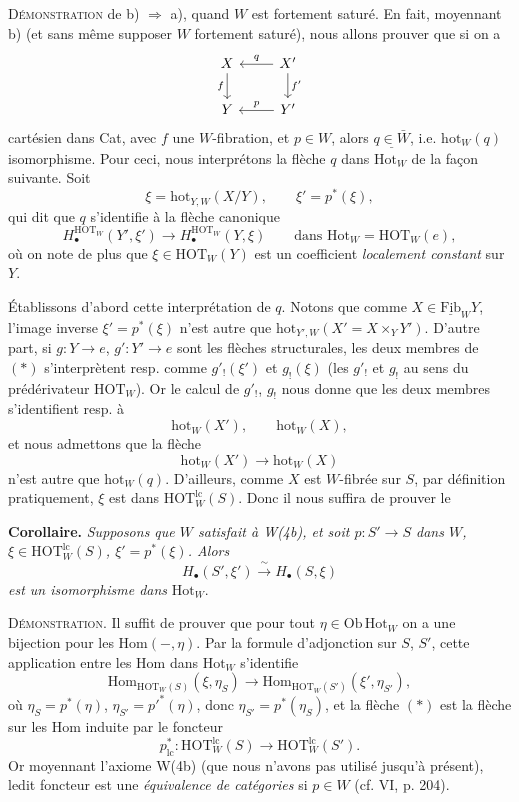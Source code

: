\documentclass[11pt]{article}
\newcommand{\printedpage}[1]{\marginpar{\footnotesize p.~#1}}
\newcommand{\msp}[1]{\marginpar{\footnotesize [#1]}}
\newcommand{\Fib}{\mathrm{Fib}}
\newcommand{\HOT}{\mathrm{HOT}}
\newcommand{\Hot}{\mathrm{Hot}}
\newcommand{\hot}{\mathrm{hot}}
\newcommand{\Hom}{\mathrm{Hom}}
\begin{document}
\textsc{Démonstration} de b) $\Longrightarrow$ a), quand $W$ est fortement saturé. En fait, moyennant b) (et sans même supposer $W$ fortement saturé), nous allons prouver que si on a
\[
\begin{tikzcd}
X & X' \arrow[l,"q"'] \arrow[d,"f'"] \\
Y \arrow[from=u,"f"'] & Y' \arrow[l,"p"']
\end{tikzcd}
\]
cartésien dans Cat, avec
\msp{page 55}
$f$ une $W$-fibration, et $p \in W$, alors $\underline{q \in \bar{W}}$, i.e. $\hot_W(q)$ isomorphisme. Pour ceci, nous interprétons la flèche $q$ dans $\Hot_W$ de la façon suivante. Soit
\[
\xi = \hot_{Y,W}(X/Y), \qquad \xi' = p^*(\xi),
\]
\printedpage{41}
qui dit que $q$ s'identifie à la flèche canonique
\[
H_\bullet^{\HOT_W}(Y',\xi') \longrightarrow H_\bullet^{\HOT_W}(Y,\xi) \qquad \text{dans } \Hot_W = \HOT_W(e), \tag*{$(*)$}
\]
où on note de plus que $\xi \in \HOT_W(Y)$ est un coefficient \textit{localement constant} sur $Y$.

Établissons d'abord cette interprétation de $q$. Notons que comme $X \in \underline{\Fib}_W Y$, l'image inverse $\xi' = p^*(\xi)$ n'est autre que $\hot_{Y',W}(X' = X \times_Y Y')$. D'autre part, si $g : Y \longrightarrow e$, $g' : Y' \longrightarrow e$ sont les flèches structurales, les deux membres de $(*)$ s'interprètent resp. comme $g'_!(\xi')$ et $g_!(\xi)$ (les $g'_!$ et $g_!$ au sens du prédérivateur $\HOT_W$). Or le calcul de $g'_!$, $g_!$ nous donne que les deux membres s'identifient resp. à
\[
\hot_W(X'), \qquad \hot_W(X),
\]
et nous admettons que la flèche
\[
\hot_W(X') \longrightarrow \hot_W(X)
\]
n'est autre que $\hot_W(q)$. D'ailleurs, comme $X$ est $W$-fibrée sur $S$, par définition pratiquement, $\xi$ est dans $\HOT^{\mathrm{lc}}_W(S)$. Donc il nous suffira de prouver le

\msp{page 56}

\textbf{Corollaire.} \textit{Supposons que $W$ satisfait à W(4b), et soit $p : S' \longrightarrow S$ dans $W$, $\xi \in \HOT^{\mathrm{lc}}_W(S)$, $\xi' = p^*(\xi)$. Alors}
\[
H_\bullet(S',\xi') \xrightarrow{\ \sim\ } H_\bullet(S,\xi)
\]
\textit{est un isomorphisme dans} $\Hot_W$.

\textsc{Démonstration}. Il suffit de prouver que pour tout $\eta \in \mathrm{Ob}\,\Hot_W$ on a une bijection pour les $\Hom(-,\eta)$. Par la formule d'adjonction sur $S$, $S'$, cette application entre les Hom dans $\Hot_W$ s'identifie
\[
\Hom_{\HOT_W(S)}(\xi,\eta_S) \longrightarrow \Hom_{\HOT_W(S')}(\xi',\eta_{S'}),
\]
où $\eta_S = p^*(\eta)$, $\eta_{S'} = p'^*(\eta)$, donc $\eta_{S'} = p^*(\eta_S)$, et la flèche $(*)$ est la flèche sur les Hom induite par le foncteur
\[
p^*_{\mathrm{lc}} : \HOT^{\mathrm{lc}}_W(S) \longrightarrow \HOT^{\mathrm{lc}}_W(S').
\]
Or moyennant l'axiome W(4b) (que nous n'avons pas utilisé jusqu'à présent), ledit foncteur est une \textit{équivalence de catégories} si $p \in W$ (cf. VI, p. 204).
\end{document}
